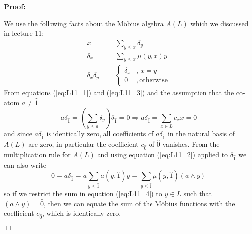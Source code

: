 \documentclass[11pt,english]{article}
\newcommand{\Mob}[0]{M\"{o}bius }
\newenvironment{proof}{\noindent \textbf{Proof:}}{$\Box$}
\begin{document}
\begin{proof}

We use the following facts about the \Mob algebra $A\left(L\right)$
which we discussed in lecture 11:\begin{eqnarray}
x & = & \sum_{y\le x}\delta_{y}\label{eq:L11_1}\\
\delta_{x} & = & \sum_{y\le x}\mu\left(y,x\right)y\label{eq:L11_2}\\
\delta_{x}\delta_{y} & = & \left\{ \begin{array}{cc}
\delta_{x} & ,\, x=y\\
0 & ,\,\text{otherwise}\end{array}\right.\label{eq:L11_3}\end{eqnarray}
From equations (\ref{eq:L11_1}) and (\ref{eq:L11_3}) and the assumption
that the co-atom $a\neq\hat{1}$ \[
a\delta_{\hat{1}}=\left(\sum_{y\le a}\delta_{y}\right)\delta_{\hat{1}}=0\Rightarrow a\delta_{\hat{1}}=\sum_{x\in L}c_{x}x=0\]
and since $a\delta_{\hat{1}}$ is identically zero, all coefficients
of $a\delta_{\hat{1}}$ in the natural basis of $A\left(L\right)$
are zero, in particular the coefficient $c_{\hat{0}}$ of $\hat{0}$
vanishes. From the multiplication rule for $A\left(L\right)$ and
using equation (\ref{eq:L11_2}) applied to $\delta_{\hat{1}}$ we
can also write\begin{equation}
0=a\delta_{\hat{1}}=a\sum_{y\le\hat{1}}\mu\left(y,\hat{1}\right)y=\sum_{y\le\hat{1}}\mu\left(y,\hat{1}\right)\left(a\wedge y\right)\label{eq:L11_4}\end{equation}
so if we restrict the sum in equation (\ref{eq:L11_4}) to $y\in L$
such that $\left(a\wedge y\right)=\hat{0}$, then we can equate the
sum of the \Mob functions with the coefficient $c_{\hat{0}}$, which
is identically zero.

\end{proof}
\end{document}
